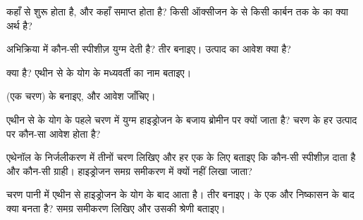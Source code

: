 \begin{exercise}[$\star$]\label{exo:g12:curly-arrows:3}
 कहाँ से शुरू होता है, और कहाँ समाप्त होता है? किसी ऑक्सीजन  के 
से किसी कार्बन  तक के  का क्या अर्थ है?
\end{exercise}

\begin{exercise}[$\star$]\label{exo:g12:curly-arrows:4}
अभिक्रिया  में कौन-सी स्पीशीज़ युग्म देती है?
तीर बनाइए। उत्पाद का आवेश क्या है?
\end{exercise}

\begin{exercise}[$\star$]\label{exo:g12:curly-arrows:5}
 क्या है? एथीन से
 के योग के मध्यवर्ती का नाम बताइए।
\end{exercise}

\begin{exercise}[$\star\star$]\label{exo:g12:curly-arrows:6}
  (एक चरण) के 
बनाइए, और आवेश जाँचिए।
\end{exercise}

\begin{exercise}[$\star\star$]\label{exo:g12:curly-arrows:7}
एथीन से  के योग के पहले चरण में
 युग्म हाइड्रोजन के बजाय ब्रोमीन पर क्यों जाता है? चरण के हर
उत्पाद पर कौन-सा आवेश होता है?
\end{exercise}

\begin{exercise}[$\star\star$]\label{exo:g12:curly-arrows:8}
एथेनॉल के निर्जलीकरण में तीनों चरण लिखिए और हर एक के लिए बताइए
कि कौन-सी स्पीशीज़ दाता है और कौन-सी ग्राही। हाइड्रोजन
 समग्र समीकरण में क्यों नहीं लिखा जाता?
\end{exercise}

\begin{exercise}[$\star\star$]\label{exo:g12:curly-arrows:9}
चरण  पानी में एथीन से हाइड्रोजन 
के योग के बाद आता है। तीर बनाइए।  के एक और निष्कासन के बाद क्या
बनता है? समग्र समीकरण लिखिए और
उसकी श्रेणी बताइए।
\end{exercise}

